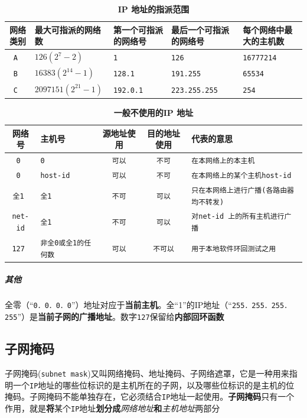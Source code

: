 \documentclass[UTF8,a4paper,12pt]{ctexbook}
\begin{document}
					\begin{table}[H]
						\centering
						\caption{\textbf{IP 地址的指派范围}}
						\begin{tabular}{|c|m{3cm}|m{3cm}|m{3cm}|m{3cm}|}
							\hline 
							网络类别 & 最大可指派的网络数 & 第一个可指派的网络号 & 最后一个可指派的网络号 & 每个网络中最大的主机数\\
							\hline
							\verb|A |&$126(2^7 - 2) $ & \verb|1| & \verb|126| & \verb|16777214|\\
							\verb|B |&$16383(2^{14} - 1) $ & \verb|128.1| & \verb|191.255| & \verb|65534|\\
							\verb|C |&$2097151(2^{21} - 1) $ & \verb|192.0.1| & \verb|223.255.255| & \verb|254|\\
							\hline
						\end{tabular}
					\end{table}
					
					\begin{table}[H]
						\centering
						\caption{\textbf{一般不使用的IP 地址}}
						\begin{tabular}{|c|m{3.1cm}|c|c|m{7cm}|}
							\hline 
							网络号 & 主机号 & 源地址使用 & 目的地址使用 & 代表的意思\\
							\hline
							\verb|0 |&\verb|0 | & \verb|可以| & \verb|不可| & \verb|在本网络上的本主机| \\
							\verb|0 |&\verb|host-id | & \verb|可以| & \verb|不可| & \verb|在本网络上的某个主机host-id| \\
							\verb|全1 |&\verb|全1 | & \verb|不可| & \verb|可以| & \verb|只在本网络上进行广播(各路由器均不转发)| \\
							\verb|net-id|&\verb|全1 | & \verb|不可| & \verb|可以| & \verb|对net-id 上的所有主机进行广播| \\
							\verb|127 |&\verb|非全0或全1的任何数| & \verb|可以| & \verb|不可以| & \verb|用于本地软件环回测试之用| \\
							\hline
						\end{tabular}
					\end{table}
				\subparagraph{其他} 全零（“\verb|0．0．0．0|”）地址对应于\textbf{当前主机}。全“1”的IP地址（“\verb|255．255．255．255|”）是\textbf{当前子网的广播地址}。数字\verb|127|保留给\textbf{内部回环函数}
					
		\subsection{子网掩码}
			子网掩码(\verb|subnet mask|)又叫网络掩码、地址掩码、子网络遮罩，它是一种用来指明一个\verb|IP|地址的哪些位标识的是主机所在的子网，以及哪些位标识的是主机的位掩码。子网掩码不能单独存在，它必须结合\verb|IP|地址一起使用。\textbf{子网掩码}只有一个作用，就是\textbf{将}某个\verb|IP|地址\textbf{划分成}\textit{网络地址}\textbf{和}\textit{主机地址}两部分
				
\end{document}
